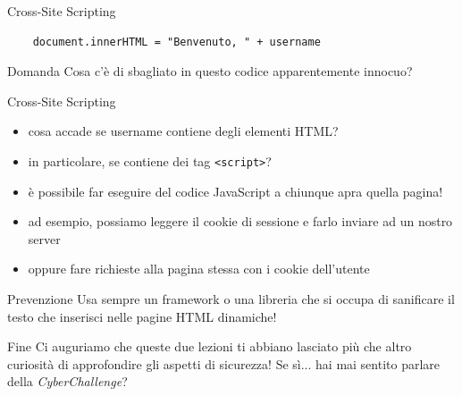\documentclass[12pt]{beamer}
\begin{document}
\begin{frame}[fragile]{Cross-Site Scripting}
\begin{verbatim}
    document.innerHTML = "Benvenuto, " + username
\end{verbatim}
\vfill
\begin{exampleblock}{Domanda}
Cosa c'è di sbagliato in questo codice apparentemente innocuo?
\end{exampleblock}
\end{frame}

\begin{frame}{Cross-Site Scripting}
\begin{itemize}
\item cosa accade se username contiene degli elementi HTML?
\pause
\item in particolare, se contiene dei tag \texttt{<script>}?
\pause
\item è possibile far eseguire del codice JavaScript a chiunque apra quella pagina!
\pause
\item ad esempio, possiamo leggere il cookie di sessione e farlo inviare ad un nostro server
\pause
\item oppure fare richieste alla pagina stessa con i cookie dell'utente
\end{itemize}
\pause
\vfill
\begin{alertblock}{Prevenzione}
Usa sempre un framework o una libreria che si occupa di sanificare il testo che inserisci nelle pagine HTML dinamiche!
\end{alertblock}
\end{frame}

\begin{frame}{Fine}
Ci auguriamo che queste due lezioni ti abbiano lasciato più che altro curiosità di approfondire gli aspetti di sicurezza!
\vfill
Se sì... hai mai sentito parlare della \textit{CyberChallenge}?
\end{frame}
\end{document}
